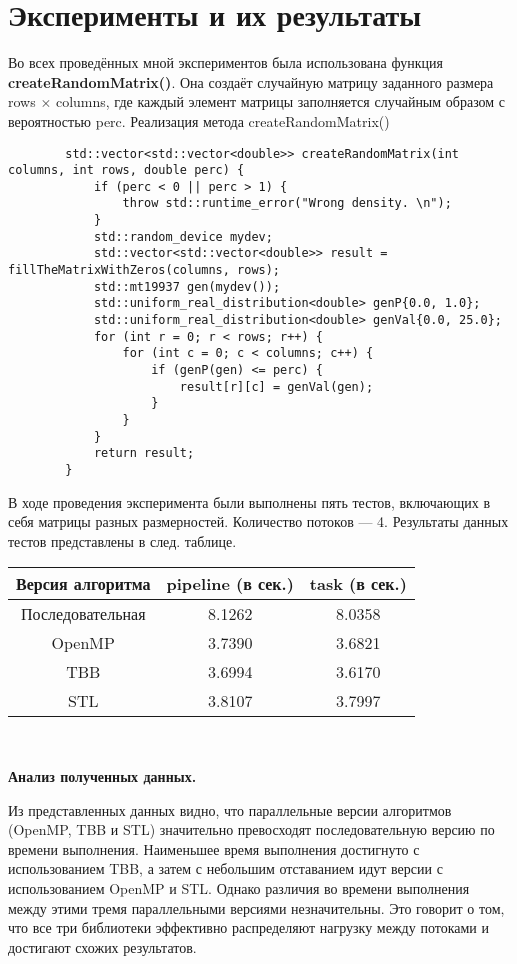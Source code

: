 \documentclass[a4paper, 14pt]{article}
\newcommand{\n}{\par}
\begin{document}
	\newpage
	\section*{\centering Эксперименты и их результаты}
	
	Во всех проведённых мной экспериментов была использована функция \textbf{createRandomMatrix()}. Она создаёт случайную матрицу заданного размера rows $\times$ columns, где каждый элемент матрицы заполняется случайным образом с вероятностью perc.
	Реализация метода createRandomMatrix()
	\begin{verbatim}
		std::vector<std::vector<double>> createRandomMatrix(int columns, int rows, double perc) {
			if (perc < 0 || perc > 1) {
				throw std::runtime_error("Wrong density. \n");
			}
			std::random_device mydev;
			std::vector<std::vector<double>> result = fillTheMatrixWithZeros(columns, rows);
			std::mt19937 gen(mydev());
			std::uniform_real_distribution<double> genP{0.0, 1.0};
			std::uniform_real_distribution<double> genVal{0.0, 25.0};
			for (int r = 0; r < rows; r++) {
				for (int c = 0; c < columns; c++) {
					if (genP(gen) <= perc) {
						result[r][c] = genVal(gen);
					}
				}
			}
			return result;
		}
	\end{verbatim}
	
	В ходе проведения эксперимента были выполнены пять тестов, включающих в себя матрицы разных размерностей. Количество потоков --- 4.  Результаты данных тестов представлены в след. таблице.
	
	\begin{center}
		\begin{tabular}{ ||c | c | c ||  }
			\hline Версия алгоритма & pipeline (в сек.) & task (в сек.)\\ 
			\hline Последовательная & 8.1262 & 8.0358 \\
			\hline OpenMP & 3.7390 & 3.6821 \\
			\hline TBB & 3.6994 & 3.6170 \\ 
			\hline STL & 3.8107 & 3.7997 \\ 
			\hline
		\end{tabular}\\[5mm]
	\end{center}
	
	\textbf{Анализ полученных данных.}
	
	\noindent Из представленных данных видно, что параллельные версии алгоритмов (OpenMP, TBB и STL) значительно превосходят последовательную версию по времени выполнения. Наименьшее время выполнения достигнуто с использованием TBB, а затем с небольшим отставанием идут версии с использованием OpenMP и STL. Однако различия во времени выполнения между этими тремя параллельными версиями незначительны. Это говорит о том, что все три библиотеки эффективно распределяют нагрузку между потоками и достигают схожих результатов.
	
\end{document}
